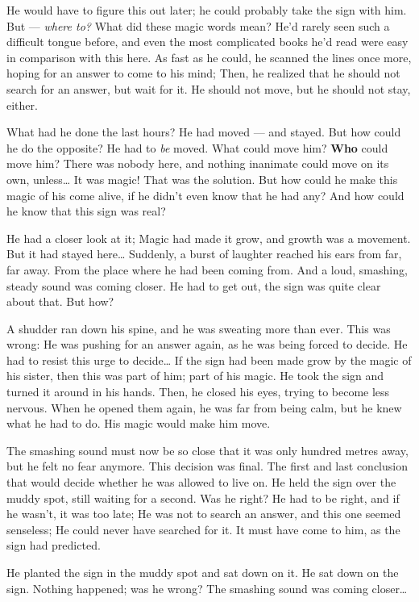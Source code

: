He would have to figure this out later; he could probably take the sign with him.
But --- \emph{where to?} 
What did these magic words mean? He'd rarely seen such a difficult tongue before, and even the most complicated books he'd read were easy in comparison with this here. 
As fast as he could, he scanned the lines once more, hoping for an answer to come to his mind; Then, he realized that he should not search for an answer, but wait for it. 
He should not move, but he should not stay, either.

What had he done the last hours? He had moved --- and stayed. But how could he do the opposite? 
He had to \emph{be} moved. What could move him? \textbf{Who} could move him? There was nobody here, and nothing inanimate could move on its own, unless\dots
It was magic! That was the solution. But how could he make this magic of his come alive, if he didn't even know that he had any?
And how could he know that this sign was real?

He had a closer look at it; Magic had made it grow, and growth was a movement. But it had stayed here\dots
Suddenly, a burst of laughter reached his ears from far, far away. 
From the place where he had been coming from. 
And a loud, smashing, steady sound was coming closer. He had to get out, the sign was quite clear about that. But how?

A shudder ran down his spine, and he was sweating more than ever. This was wrong: He was pushing for an answer again, as he was being forced to decide. He had to resist this urge to decide\dots
If the sign had been made grow by the magic of his sister, then this was part of him; part of his magic.
He took the sign and turned it around in his hands. Then, he closed his eyes, trying to become less nervous. When he opened them again, he was far from being calm, but he knew what he had to do. 
His magic would make him move.

The smashing sound must now be so close that it was only hundred metres away, but he felt no fear anymore. This decision was final. 
The first and last conclusion that would decide whether he was allowed to live on. 
He held the sign over the muddy spot, still waiting for a second. Was he right? He had to be right, and if he wasn't, it was too late; He was not to search an answer, and this one seemed senseless; He could never have searched for it. 
It must have come to him, as the sign had predicted.

He planted the sign in the muddy spot and sat down on it. He sat down on the sign. Nothing happened; was he wrong? 
The smashing sound was coming closer\dots


